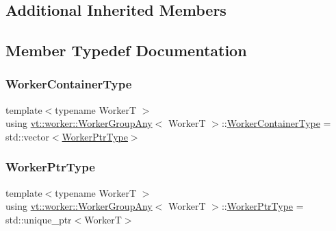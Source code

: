 \subsection*{Additional Inherited Members}


\subsection{Member Typedef Documentation}
\mbox{\label{structvt_1_1worker_1_1_worker_group_any_ad7e74c099f11c75bc35c838baedaa2cd}} 
\subsubsection{\texorpdfstring{Worker\+Container\+Type}{WorkerContainerType}}
{\footnotesize\ttfamily template$<$typename WorkerT $>$ \\
using \hyperlink{structvt_1_1worker_1_1_worker_group_any}{vt\+::worker\+::\+Worker\+Group\+Any}$<$ WorkerT $>$\+::\hyperlink{structvt_1_1worker_1_1_worker_group_any_ad7e74c099f11c75bc35c838baedaa2cd}{Worker\+Container\+Type} =  std\+::vector$<$\hyperlink{structvt_1_1worker_1_1_worker_group_any_a1c5f50479aa26bcea9491f5ca41138d7}{Worker\+Ptr\+Type}$>$}

\mbox{\label{structvt_1_1worker_1_1_worker_group_any_a1c5f50479aa26bcea9491f5ca41138d7}} 
\subsubsection{\texorpdfstring{Worker\+Ptr\+Type}{WorkerPtrType}}
{\footnotesize\ttfamily template$<$typename WorkerT $>$ \\
using \hyperlink{structvt_1_1worker_1_1_worker_group_any}{vt\+::worker\+::\+Worker\+Group\+Any}$<$ WorkerT $>$\+::\hyperlink{structvt_1_1worker_1_1_worker_group_any_a1c5f50479aa26bcea9491f5ca41138d7}{Worker\+Ptr\+Type} =  std\+::unique\+\_\+ptr$<$WorkerT$>$}

